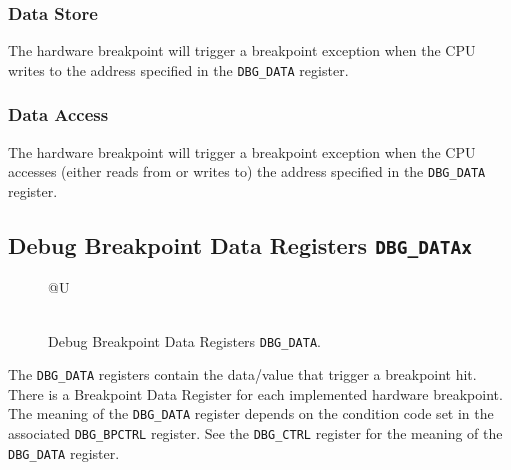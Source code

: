 \subsubsection{Data Store}\label{data-store}

The hardware breakpoint will trigger a breakpoint exception when the CPU
writes to the address specified in the \texttt{DBG\_DATA} register.

\subsubsection{Data Access}\label{data-access}

The hardware breakpoint will trigger a breakpoint exception when the CPU
accesses (either reads from or writes to) the address specified in the
\texttt{DBG\_DATA} register.

\subsection{Debug Breakpoint Data Registers
\texttt{DBG\_DATAx}}\label{debug-breakpoint-data-registers-dbg_datax}

\ifdefined\MARKDOWN
\else

\begin{figure*}[htb!]
	{\footnotesize
		\begin{center}
			\begin{tabular}{@{}U}
				 \\
				\hline
				  \\
				\hline
			\end{tabular}
		\end{center}
	}
	\vspace{-0.1in}
	\caption{Debug Breakpoint Data Registers \texttt{DBG\_DATA}.}
	\label{fig:dbgdatareg}
\end{figure*}

\fi

The \texttt{DBG\_DATA} registers contain the data/value that trigger a breakpoint
hit. There is a Breakpoint Data Register for each implemented hardware
breakpoint. The meaning of the \texttt{DBG\_DATA} register depends on the
condition code set in the associated \texttt{DBG\_BPCTRL} register. See the
\texttt{DBG\_CTRL} register for the meaning of the \texttt{DBG\_DATA} register.
